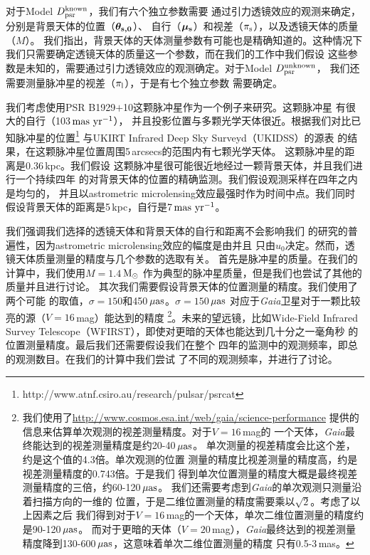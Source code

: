对于Model $D_{\rm{psr}}^{\rm{known}}$，我们有六个独立参数需要
通过引力透镜效应的观测来确定，分别是背景天体的位置（$\bm{\theta_{\rm{s,0}}}$）、
自行（$\bm{\mu_{\rm{s}}}$）和视差（$\pi_{\rm{s}}$），以及透镜天体的质量（$M$）。
我们指出，背景天体的天体测量参数有可能也是精确知道的。这种情况下
我们只需要确定透镜天体的质量这一个参数，而在我们的工作中我们假设
这些参数是未知的，需要通过引力透镜效应的观测确定。对于Model $D_{\rm{psr}}^{\rm{unknown}}$，
我们还需要测量脉冲星的视差（$\pi_{\rm{l}}$），于是有七个独立参数
需要确定。

我们考虑使用PSR B1929$+$10这颗脉冲星作为一个例子来研究。这颗脉冲星
有很大的自行（103\,$\rm{mas\ yr^{-1}}$）\supercite{Chatterjee04}，
并且投影位置与多颗光学天体很近。根据我们对比已知脉冲星的位置\supercite{Manchester05}\footnote{http://www.atnf.csiro.au/research/pulsar/psrcat} 
与UKIRT Infrared Deep Sky Surveyd（UKIDSS）的源表\supercite{Lawrence}
的结果，在这颗脉冲星位置周围5\,arcsecs的范围内有七颗光学天体。
这颗脉冲星的距离是0.36\,kpc\supercite{Chatterjee04}。我们假设
这颗脉冲星很可能很近地经过一颗背景天体，并且我们进行一个持续四年
的对背景天体的位置的精确监测。我们假设观测采样在四年之内是均匀的，
并且以astrometric microlensing效应最强时作为时间中点。我们同时
假设背景天体的距离是5\,kpc，自行是7\,$\rm{mas\ yr^{-1}}$。

%
我们强调我们选择的透镜天体和背景天体的自行和距离不会影响我们
的研究的普遍性，因为astrometric microlensing效应的幅度是由并且
只由$u_0$决定。然而，透镜天体质量测量的精度与几个参数的选取有关。
首先是脉冲星的质量。在我们的计算中，我们使用$M=1.4$\,$\rm{M_{\odot}}$
作为典型的脉冲星质量，但是我们也尝试了其他的质量并且进行讨论。
其次我们需要假设背景天体的位置测量的精度。我们使用了两个可能
的取值，$\sigma=150$和450\,$\rm{\mu as}$。$\sigma=150$\,$\rm{\mu as}$
对应于\textit{Gaia}卫星对于一颗比较亮的源（$V=16$\,mag）能达到的精度
\footnote{我们使用了\url{http://www.cosmos.esa.int/web/gaia/science-performance} 
提供的信息来估算单次观测的视差测量精度。对于$V=16$\,mag的
一个天体，\textit{Gaia}最终能达到的视差测量精度是约20-40\,$\rm{\mu as}$。
单次测量的视差精度会比这个差，约是这个值的4.3倍。单次观测的位置
测量的精度比视差测量的精度高，约是视差测量精度的0.743倍。于是我们
得到单次位置测量的精度大概是最终视差测量精度的三倍，约60-120\,$\rm{\mu as}$。
我们还需要考虑到\textit{Gaia}的单次观测只测量沿着扫描方向的一维的
位置，于是二维位置测量的精度需要乘以$\sqrt{2}$。考虑了以上因素之后
我们得到对于$V=16$\,mag的一个天体，单次二维位置测量的精度约是90-120\,$\rm{\mu as}$。
而对于更暗的天体（$V=20$\,mag），\textit{Gaia}最终达到的视差测量
精度降到130-600\,$\rm{\mu as}$，这意味着单次二维位置测量的精度
只有0.5-3\,mas。}。未来的望远镜，比如Wide-Field Infrared Survey 
Telescope（WFIRST），即使对更暗的天体也能达到几十分之一毫角秒
的位置测量精度\supercite{Spergel}。最后我们还需要假设我们在整个
四年的监测中的观测频率，即总的观测数目。在我们的计算中我们尝试
了不同的观测频率，并进行了讨论。

